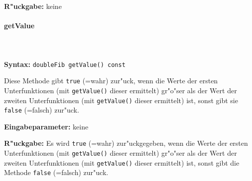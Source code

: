 \bigskip\noindent
\textbf{R"uckgabe:} keine


\paragraph{getValue}

\ \\\\\noindent
\textbf{Syntax:} \verb|doubleFib getValue() const|

\bigskip\noindent
Diese Methode gibt \verb|true| (=wahr) zur"uck, wenn die Werte der ersten Unterfunktionen (mit \verb|getValue()| dieser ermittelt) gr"o"ser als der Wert der zweiten Unterfunktionen (mit \verb|getValue()| dieser ermittelt) ist, sonst gibt sie \verb|false| (=falsch) zur"uck.

\bigskip\noindent
\textbf{Eingabeparameter:} keine

\bigskip\noindent
\textbf{R"uckgabe:} Es wird \verb|true| (=wahr) zur"uckgegeben, wenn die Werte der ersten Unterfunktionen (mit \verb|getValue()| dieser ermittelt) gr"o"ser als der Wert der zweiten Unterfunktionen (mit \verb|getValue()| dieser ermittelt) ist, sonst gibt die Methode \verb|false| (=falsch) zur"uck.
























